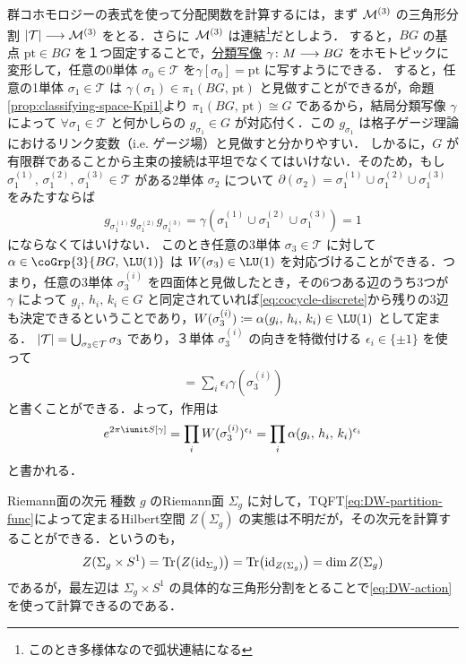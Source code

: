 \documentclass[TQFT_main]{subfiles}
\begin{document}
群コホモロジーの表式を使って分配関数を計算するには，まず $\mathcal{M}^{(3)}$ の三角形分割 $\abs{\mathcal{T}} \longrightarrow \mathcal{M}^{(3)}$ をとる．さらに $\mathcal{M}^{(3)}$ は連結\footnote{このとき多様体なので弧状連結になる}だとしよう．
すると，$BG$ の基点 $\mathrm{pt} \in BG$ を１つ固定することで，\hyperref[prop:universal-basic]{分類写像} $\gamma \colon M \longrightarrow BG$ をホモトピックに変形して，任意の0単体 $\sigma_0 \in \mathcal{T}$ を$\gamma[\sigma_0] = \mathrm{pt}$ に写すようにできる．
すると，任意の1単体 $\sigma_1 \in \mathcal{T}$ は $\gamma(\sigma_1) \in \pi_1(BG,\, \mathrm{pt})$ と見做すことができるが，命題\ref{prop:classifying-space-Kpi1}より $\pi_1(BG,\, \mathrm{pt}) \cong G$ であるから，結局分類写像 $\gamma$ によって $\forall \sigma_1 \in \mathcal{T}$ と何かしらの $g_{\sigma_1} \in G$ が対応付く．この $g_{\sigma_1}$ は格子ゲージ理論におけるリンク変数（i.e. ゲージ場）と見做すと分かりやすい．
しかるに，$G$ が有限群であることから主束の接続は平坦でなくてはいけない．そのため，もし $\sigma^{(1)}_1,\, \sigma^{(2)}_1,\, \sigma^{(3)}_1 \in \mathcal{T}$ がある2単体 $\sigma_2$ について $\partial(\sigma_2) = \sigma^{(1)}_1 \cup \sigma^{(2)}_1 \cup \sigma^{(3)}_1$ をみたすならば
\begin{align}
    \label{eq:cocycle-discrete}
    g_{\sigma_1^{(1)}} g_{\sigma_1^{(2)}} g_{\sigma_1^{(3)}} = \gamma(\sigma^{(1)}_1 \cup \sigma^{(2)}_1 \cup \sigma^{(3)}_1) = 1
\end{align}
にならなくてはいけない．
このとき任意の3単体 $\sigma_3 \in \mathcal{T}$ に対して $\alpha \in \coGrp{3}{BG,\, \LU(1)}$ は $W(\sigma_3) \in \LU(1)$ を対応づけることができる．つまり，任意の3単体 $\sigma^{(i)}_3$ を四面体と見做したとき，その6つある辺のうち3つが $\gamma$ によって $g_i,\, h_i,\, k_i \in G$ と同定されていれば\eqref{eq:cocycle-discrete}から残りの3辺も決定できるということであり，$W(\sigma_3^{(i)}) \coloneqq \alpha (g_i,\, h_i,\, k_i) \in \LU(1)$ として定まる．
$\abs{\mathcal{T}} = \bigcup_{\sigma_3 \in \mathcal{T}} \sigma_3$ であり，３単体 $\sigma_3^{(i)}$ の向きを特徴付ける $\epsilon_i \in \{\pm 1\}$ を使って
\begin{align}
    [M] = \sum_i \epsilon_i \gamma(\sigma_3^{(i)})
\end{align}
と書くことができる．よって，作用は
\begin{align}
    \label{eq:DW-action}
    e^{2\pi \iunit S[\gamma]} = \prod_i W(\sigma_3^{(i)})^{\epsilon_i} = \prod_{i} \alpha (g_{i},\, h_i,\, k_i)^{\epsilon_i}
\end{align}
と書かれる．

\begin{myexample}[label=ex:DW-Riemannian]{Riemann面の次元}
    種数 $g$ のRiemann面 $\Sigma_g$ に対して，TQFT\eqref{eq:DW-partition-func}によって定まるHilbert空間 $Z(\Sigma_g)$ の実態は不明だが，その次元を計算することができる．というのも，
    \begin{align}
        Z(\Sigma_g \times S^1) = \Tr \bigl(Z(\mathrm{id}_{\Sigma_g})\bigr) = \Tr \bigl( \mathrm{id}_{Z(\Sigma_g)} \bigr) = \dim Z(\Sigma_g)
    \end{align}
    であるが，最左辺は $\Sigma_g \times S^1$ の具体的な三角形分割をとることで\eqref{eq:DW-action}を使って計算できるのである．
\end{myexample}
\end{document}

